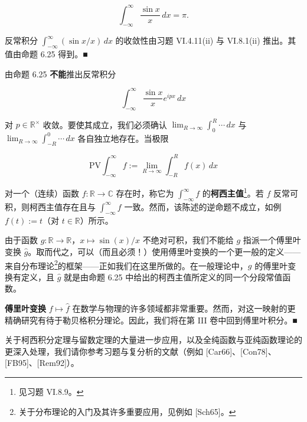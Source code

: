 \begin{corollary}
\[
\int_{-\infty}^{\infty}\frac{\sin x}{x}\,dx = \pi .
\]

\proofhead
反常积分 $ \int_{-\infty}^{\infty}(\sin x/x)\,dx $ 的收敛性由习题 VI.4.11(ii) 与 VI.8.1(ii) 推出。其值由命题 6.25 得到。\nobreak\hspace{0.35em}■
\end{corollary}

\begin{remark}

\begin{items}
\item

由命题 6.25 \textbf{不能}推出反常积分

\[
\int_{-\infty}^{\infty}\frac{\sin x}{x}e^{ipx}\,dx
\]

对 $ p \in \mathbb{R}^{\times} $ 收敛。要使其成立，我们必须确认 $ \lim_{R\to\infty}\int_{0}^{R}\cdots\,dx $ 与 $ \lim_{R\to\infty}\int_{-R}^{0}\cdots\,dx $ 各自独立地存在。当极限

\[
\mathrm{PV}\int_{-\infty}^{\infty}f := \lim_{R\to\infty}\int_{-R}^{R}f(x)\,dx
\]

对一个（连续）函数 $ f : \mathbb{R} \to \mathbb{C} $ 存在时，称它为 $ \int_{-\infty}^{\infty}f $ 的\textbf{柯西主值}\footnote{见习题 VI.8.9。}。若 $ f $ 反常可积，则柯西主值存在且与 $ \int_{-\infty}^{\infty}f $ 一致。然而，该陈述的逆命题不成立，如例 $ f(t) := t $（对 $ t \in \mathbb{R} $）所示。

\item

由于函数 $ g : \mathbb{R} \to \mathbb{R} $，$ x \mapsto \sin(x)/x $ 不绝对可积，我们不能给 $ g $ 指派一个傅里叶变换 $ \widehat{g} $。取而代之，可以（而且必须！）使用傅里叶变换的一个更一般的定义——来自分布理论\footnote{关于分布理论的入门及其许多重要应用，见例如 [Sch65]。}的框架——正如我们在这里所做的。在一般理论中，$ g $ 的傅里叶变换有定义，且 $ \widehat{g} $ 就是由命题 6.25 中给出的柯西主值所定义的同一个分段常值函数。

\item

\textbf{傅里叶变换} $ f \mapsto \widehat{f} $ 在数学与物理的许多领域都非常重要。然而，对这一映射的更精确研究有待于勒贝格积分理论。因此，我们将在第 III 卷中回到傅里叶积分。\nobreak\hspace{0.35em}■

\end{items}

关于柯西积分定理与留数定理的大量进一步应用，以及全纯函数与亚纯函数理论的更深入处理，我们请你参考习题与复分析的文献（例如 [Car66]、[Con78]、[FB95]、[Rem92]）。

\end{remark}

